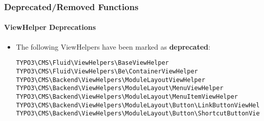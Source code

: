 %

\begin{frame}[fragile]
	\frametitle{Deprecated/Removed Functions}
	\framesubtitle{ViewHelper Deprecations}


	\begin{itemize}
		\item The following ViewHelpers have been marked as \textbf{deprecated}:
\begin{lstlisting}
TYPO3\CMS\Fluid\ViewHelpers\BaseViewHelper
TYPO3\CMS\Fluid\ViewHelpers\Be\ContainerViewHelper
TYPO3\CMS\Backend\ViewHelpers\ModuleLayoutViewHelper
TYPO3\CMS\Backend\ViewHelpers\ModuleLayout\MenuViewHelper
TYPO3\CMS\Backend\ViewHelpers\ModuleLayout\MenuItemViewHelper
TYPO3\CMS\Backend\ViewHelpers\ModuleLayout\Button\LinkButtonViewHelper
TYPO3\CMS\Backend\ViewHelpers\ModuleLayout\Button\ShortcutButtonViewHelp
\end{lstlisting}

	\end{itemize}

\end{frame}

